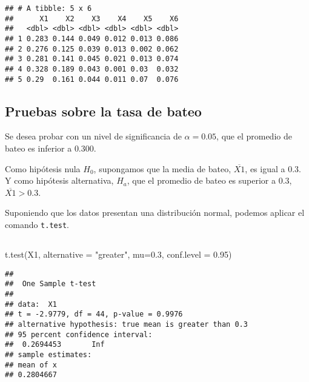 \documentclass{staprojteamusb}
\newenvironment{Shaded}{\begin{snugshade}}{\end{snugshade}}
\newcommand{\AttributeTok}[1]{\textcolor[rgb]{0.77,0.63,0.00}{#1}}
\newcommand{\FloatTok}[1]{\textcolor[rgb]{0.00,0.00,0.81}{#1}}
\newcommand{\FunctionTok}[1]{\textcolor[rgb]{0.00,0.00,0.00}{#1}}
\newcommand{\NormalTok}[1]{#1}
\newcommand{\OtherTok}[1]{\textcolor[rgb]{0.56,0.35,0.01}{#1}}
\newcommand{\SpecialCharTok}[1]{\textcolor[rgb]{0.00,0.00,0.00}{#1}}
\newcommand{\StringTok}[1]{\textcolor[rgb]{0.31,0.60,0.02}{#1}}
\begin{document}
\begin{verbatim}
## # A tibble: 5 x 6
##      X1    X2    X3    X4    X5    X6
##   <dbl> <dbl> <dbl> <dbl> <dbl> <dbl>
## 1 0.283 0.144 0.049 0.012 0.013 0.086
## 2 0.276 0.125 0.039 0.013 0.002 0.062
## 3 0.281 0.141 0.045 0.021 0.013 0.074
## 4 0.328 0.189 0.043 0.001 0.03  0.032
## 5 0.29  0.161 0.044 0.011 0.07  0.076
\end{verbatim}

\begin{Shaded}
\end{Shaded}

 \hypertarget{pruebas-sobre-la-tasa-de-bateo-1}{%
 \subsection{Pruebas sobre la tasa de
 bateo}\label{pruebas-sobre-la-tasa-de-bateo-1}}

 Se desea probar con un nivel de significancia de \(\alpha=0.05\), que
 el promedio de bateo es inferior a \(0.300\).

 Como hipótesis nula \(H_{0}\), supongamos que la media de bateo,
 \(\overline{X1}\), es igual a \(0.3\). Y como hipótesis alternativa,
 \(H_{a}\), que el promedio de bateo es superior a \(0.3\),
 \(\overline{X1}>0.3\).

 Suponiendo que los datos presentan una distribución normal, podemos
 aplicar el comando \texttt{t.test}.

 \hypertarget{section}{%
 \subsection{}\label{section}}

\begin{Shaded}
\begin{Highlighting}[]
\FunctionTok{t.test}\NormalTok{(X1, }\AttributeTok{alternative =} \StringTok{"greater"}\NormalTok{, }\AttributeTok{mu=}\FloatTok{0.3}\NormalTok{, }\AttributeTok{conf.level =} \FloatTok{0.95}\NormalTok{)}
\end{Highlighting}
\end{Shaded}

\begin{verbatim}
## 
##  One Sample t-test
## 
## data:  X1
## t = -2.9779, df = 44, p-value = 0.9976
## alternative hypothesis: true mean is greater than 0.3
## 95 percent confidence interval:
##  0.2694453       Inf
## sample estimates:
## mean of x 
## 0.2804667
\end{verbatim}
\end{document}
